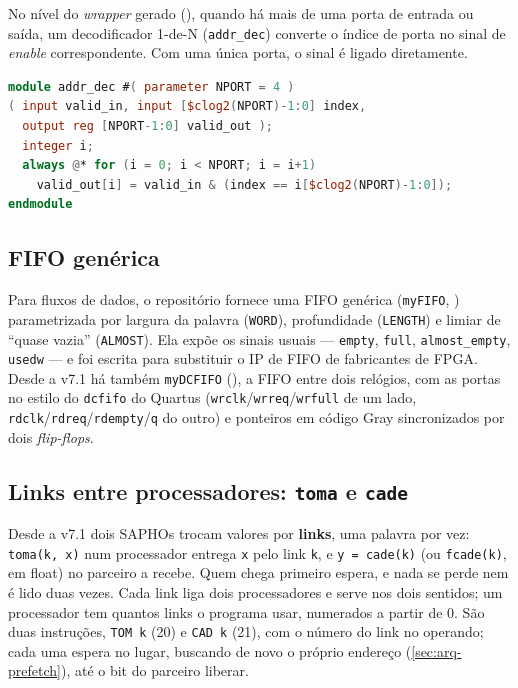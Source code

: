 No nível do \emph{wrapper} gerado (), quando há mais de uma porta de entrada ou
saída, um decodificador 1-de-N (\lstinline|addr_dec|) converte o índice de porta no sinal de
\emph{enable} correspondente. Com uma única porta, o sinal é ligado diretamente.

\begin{lstlisting}[language=Verilog]
module addr_dec #( parameter NPORT = 4 )
( input valid_in, input [$clog2(NPORT)-1:0] index,
  output reg [NPORT-1:0] valid_out );
  integer i;
  always @* for (i = 0; i < NPORT; i = i+1)
    valid_out[i] = valid_in & (index == i[$clog2(NPORT)-1:0]);
endmodule
\end{lstlisting}

\subsection{FIFO genérica}
\label{sec:arq-io-fifo}

Para fluxos de dados, o repositório fornece uma FIFO genérica (\lstinline|myFIFO|,
) parametrizada por largura da palavra (\lstinline|WORD|), profundidade
(\lstinline|LENGTH|) e limiar de ``quase vazia'' (\lstinline|ALMOST|). Ela expõe os sinais
usuais --- \lstinline|empty|, \lstinline|full|, \lstinline|almost_empty|, \lstinline|usedw| ---
e foi escrita para substituir o IP de FIFO de fabricantes de FPGA. Desde a v7.1 há também
\lstinline|myDCFIFO| (), a FIFO entre dois relógios, com as portas no
estilo do \lstinline|dcfifo| do Quartus (\lstinline|wrclk|/\lstinline|wrreq|/\lstinline|wrfull|
de um lado, \lstinline|rdclk|/\lstinline|rdreq|/\lstinline|rdempty|/\lstinline|q| do outro) e
ponteiros em código Gray sincronizados por dois \emph{flip-flops}.

\subsection{Links entre processadores: \texttt{toma} e \texttt{cade}}
\label{sec:arq-links}

Desde a v7.1 dois SAPHOs trocam valores por \textbf{links}, uma palavra por vez:
\lstinline|toma(k, x)| num processador entrega \lstinline|x| pelo link \lstinline|k|, e
\lstinline|y = cade(k)| (ou \lstinline|fcade(k)|, em float) no parceiro a recebe. Quem chega
primeiro espera, e nada se perde nem é lido duas vezes. Cada link liga dois processadores e
serve nos dois sentidos; um processador tem quantos links o programa usar, numerados a partir
de 0. São duas instruções, \lstinline|TOM k| (20) e \lstinline|CAD k| (21), com o número do
link no operando; cada uma espera no lugar, buscando de novo o próprio endereço
(\autoref{sec:arq-prefetch}), até o bit do parceiro liberar.

